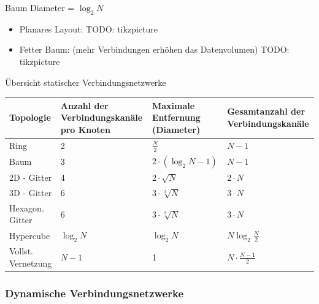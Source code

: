\begin{defi}{Baum}
    Diameter = $\log_2 N$
    \begin{itemize}
        \item Planares Layout:
              TODO: tikzpicture
        \item Fetter Baum: (mehr Verbindungen erhöhen das Datenvolumen)
              TODO: tikzpicture
    \end{itemize}
\end{defi}

\begin{bonus}{Übersicht statischer Verbindungsnetzwerke}
    \begin{tabularx}{\textwidth}{|l|X|X|X|}
        \hline
        Topologie          & Anzahl der Verbindungskanäle pro Knoten & Maximale Entfernung (Diameter) & Gesamtanzahl der Verbindungskanäle \\
        \hline
        Ring               & 2                                       & $\frac{N}{2}$                  & $N-1$                              \\
        \hline
        Baum               & 3                                       & $2\cdot (\log_2 N - 1)$        & $N-1$                              \\
        \hline
        2D - Gitter        & 4                                       & $2\cdot \sqrt{N}$              & $2\cdot N$                         \\
        \hline
        3D - Gitter        & 6                                       & $3\cdot \sqrt[3]{N}$           & $3\cdot N$                         \\
        \hline
        Hexagon. Gitter    & 6                                       & $3\cdot \sqrt[3]{N}$           & $3\cdot N$                         \\ 
        \hline
        Hypercube          & $\log_2 N$                              & $\log_2 N$                     & $N \log_2 \frac{N}{2}$             \\
        \hline
        Vollst. Vernetzung & $N - 1$                                 & 1                              & $N \cdot \frac{N-1}{2}$            \\
        \hline
    \end{tabularx}
\end{bonus}

\subsubsection{Dynamische Verbindungsnetzwerke}

